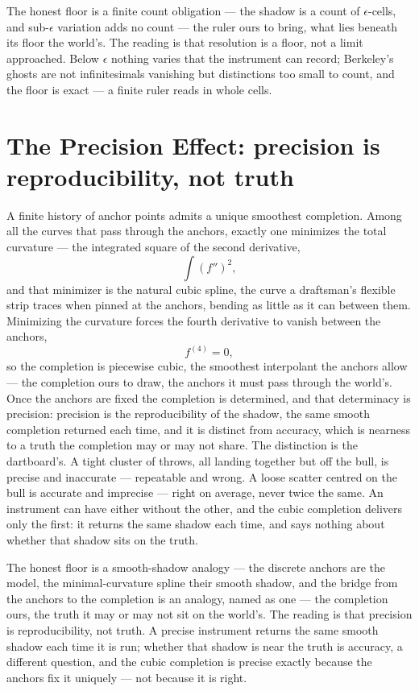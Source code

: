 The honest floor is a finite count obligation --- the shadow is a count of $\epsilon$-cells, and
sub-$\epsilon$ variation adds no count --- the ruler ours to bring, what lies beneath its floor the world's.
The reading is that resolution is a floor, not a limit approached.
Below $\epsilon$ nothing varies that the instrument can record; Berkeley's ghosts are not infinitesimals
vanishing but distinctions too small to count, and the floor is exact --- a finite ruler reads in whole cells.

\section{The Precision Effect: precision is reproducibility, not truth}
\label{se:precision}

A finite history of anchor points admits a unique smoothest completion. Among all the curves that pass through
the anchors, exactly one minimizes the total curvature --- the integrated square of the second derivative,
\begin{equation}
  \int (f'')^2 ,
\end{equation}
and that minimizer is the natural cubic spline, the curve a draftsman's flexible strip traces when pinned at
the anchors, bending as little as it can between them. Minimizing the curvature forces the fourth derivative to
vanish between the anchors,
\begin{equation}
  f^{(4)} = 0,
\end{equation}
so the completion is piecewise cubic, the smoothest interpolant the anchors allow --- the completion ours to
draw, the anchors it must pass through the world's. Once the anchors are fixed
the completion is determined, and that determinacy is precision: precision is the reproducibility of the
shadow, the same smooth completion returned each time, and it is distinct from accuracy, which is nearness to a
truth the completion may or may not share. The distinction is the dartboard's. A tight cluster of throws, all
landing together but off the bull, is precise and inaccurate --- repeatable and wrong. A loose scatter centred
on the bull is accurate and imprecise --- right on average, never twice the same. An instrument can have either
without the other, and the cubic completion delivers only the first: it returns the same shadow each time, and
says nothing about whether that shadow sits on the truth.

The honest floor is a smooth-shadow analogy --- the discrete anchors are the model, the minimal-curvature
spline their smooth shadow, and the bridge from the anchors to the completion is an analogy, named as one ---
the completion ours, the truth it may or may not sit on the world's. The
reading is that precision is reproducibility, not truth. A precise instrument returns the same smooth shadow
each time it is run; whether that shadow is near the truth is accuracy, a different question, and the cubic
completion is precise exactly because the anchors fix it uniquely --- not because it is right.

